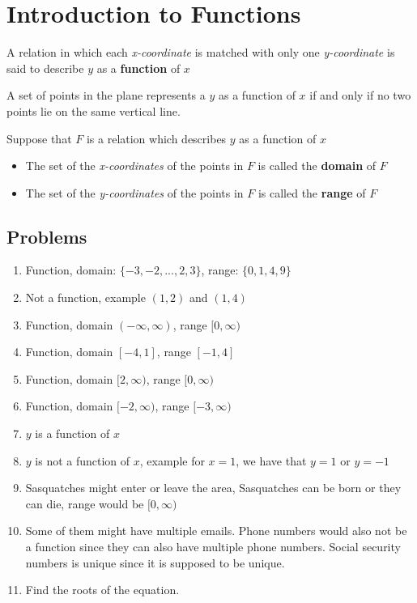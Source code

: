\section{Introduction to Functions}

\begin{definition}[Function]
    A relation in which each \textit{x-coordinate} is matched with only one \textit{y-coordinate} is said to describe $y$ as a \textbf{function} of $x$
\end{definition}

\begin{definition}
    A set of points in the plane represents a $y$ as a function of $x$ if and only if no two points lie on the same vertical line.
\end{definition}

\begin{definition}
    Suppose that $F$ is a relation which describes $y$ as a function of $x$
    \begin{itemize}
        \item The set of the \textit{x-coordinates} of the points in $F$ is called the \textbf{domain} of $F$
        \item The set of the \textit{y-coordinates} of the points in $F$ is called the \textbf{range} of $F$
    \end{itemize}
\end{definition}


\subsection{Problems}
\begin{enumerate}
    \item [1.] Function, domain: $\{-3,-2,...,2,3\}$, range: $\{0,1,4,9\}$
    \item [5.] Not a function, example $(1,2)$ and $(1,4)$
    \item [11.] Function, domain $(-\infty, \infty)$, range $[0, \infty)$
    \item [13.] Function, domain $[-4, 1]$, range $[-1,4]$
    \item [17.] Function, domain $[2, \infty)$, range $[0, \infty)$
    \item [21.] Function, domain $[-2, \infty)$, range $[-3, \infty)$
    \item [33.] $y$ is a function of $x$
    \item [47.] $y$ is not a function of $x$, example for $x=1$, we have that $y=1$ or $y=-1$
    \item [48.] Sasquatches might enter or leave the area, Sasquatches can be born or they can die, range would be $[0, \infty)$
    \item [49.] Some of them might have multiple emails. Phone numbers would also not be a function since they can also have multiple phone numbers. Social security numbers is unique since it is supposed to be unique.
    \item [50.] Find the roots of the equation.
\end{enumerate}